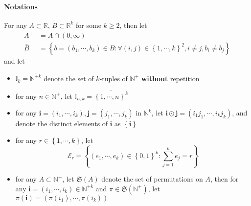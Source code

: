 \documentclass[twoside]{article}
\begin{document}
\paragraph*{Notations}
For any $A\subset \mathbb{R}$, $B\subset \mathbb{R}^k$ for some $k\geq 2$, then let 
\begin{align*}
    A^+ &= A \cap \left(0,\infty\right)\\
    \bar{B} &= \left\{ b=\left(b_1,\cdots,b_k\right)\in B: \forall (i,j)\in\left\{1,\cdots,k\right\}^2,i\neq j, b_i\neq b_j \right\}
\end{align*}
and let 
\begin{itemize}
    \item $\mathbb{I}_k = \overline{\mathbb{N}^{+k}}$ denote the set of $k$-tuples of $\mathbb{N}^+$ \textbf{without} repetition
    \item for any $n\in \mathbb{N}^+$, let $\mathbb{I}_{n,k} = \overline{\left\{1,\cdots,n\right\}^k}$
    \item for any $\mathbf{i}=\left(i_1,\cdots,i_k\right),\mathbf{j}=\left(j_1,\cdots,j_k\right)$ in $\mathbb{N}^k$, let $\mathbf{i}\odot \mathbf{j} = \left(i_1j_1,\cdots,i_kj_k\right)$, and denote the distinct elements of $\mathbf{i}$ as $\left\{\mathbf{i}\right\}$
    \item for any $r\in \left\{1,\cdots,k\right\}$, let $$ \mathcal{E}_r = \left\{ \left(e_1,\cdots,e_k\right) \in\left\{0,1\right\}^k:\sum^k_{j=1}e_j = r \right\} $$
    \item for any $A\subset \mathbb{N}^+$, let $\mathfrak{S}(A)$ denote the set of permutations on $A$, then for any $\mathbf{i}=(i_1,\cdots,i_k)\in\mathbb{N}^{+k}$ and $\pi \in \mathfrak{S}(\mathbb{N}^+)$, let $\pi(\mathbf{i}) = \left(\pi(i_1),\cdots,\pi(i_k)\right)$
\end{itemize}
\end{document}
